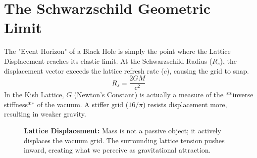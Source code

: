 \documentclass[11pt, letterpaper, openany]{book}
\begin{document}
\section{The Schwarzschild Geometric Limit}
The "Event Horizon" of a Black Hole is simply the point where the Lattice Displacement reaches its elastic limit.
At the Schwarzschild Radius ($R_s$), the displacement vector exceeds the lattice refresh rate ($c$), causing the grid to snap.
\begin{equation}
    R_s = \frac{2GM}{c^2}
\end{equation}
In the Kish Lattice, $G$ (Newton's Constant) is actually a measure of the **inverse stiffness** of the vacuum. A stiffer grid ($16/\pi$) resists displacement more, resulting in weaker gravity.

\begin{figure}[h]
\centering
{}
\caption{\textbf{Lattice Displacement:} Mass is not a passive object; it actively displaces the vacuum grid. The surrounding lattice tension pushes inward, creating what we perceive as gravitational attraction.}
\label{fig:lattice_buoyancy}
\end{figure}
\end{document}
